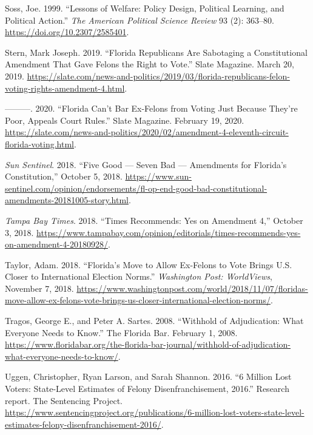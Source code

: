 \documentclass[
  12pt,
]{article}
\newlength{\cslhangindent}
\newenvironment{cslreferences}%
  {\setlength{\parindent}{0pt}%
  \everypar{\setlength{\hangindent}{\cslhangindent}}\ignorespaces}%
  {\par}
\begin{document}
\begin{cslreferences}
\leavevmode\hypertarget{ref-Soss1999}{}%
Soss, Joe. 1999. ``Lessons of Welfare: Policy Design, Political Learning, and Political Action.'' \emph{The American Political Science Review} 93 (2): 363--80. \url{https://doi.org/10.2307/2585401}.

\leavevmode\hypertarget{ref-Stern2019}{}%
Stern, Mark Joseph. 2019. ``Florida Republicans Are Sabotaging a Constitutional Amendment That Gave Felons the Right to Vote.'' Slate Magazine. March 20, 2019. \url{https://slate.com/news-and-politics/2019/03/florida-republicans-felon-voting-rights-amendment-4.html}.

\leavevmode\hypertarget{ref-Stern2020}{}%
---------. 2020. ``Florida Can't Bar Ex-Felons from Voting Just Because They're Poor, Appeals Court Rules.'' Slate Magazine. February 19, 2020. \url{https://slate.com/news-and-politics/2020/02/amendment-4-eleventh-circuit-florida-voting.html}.

\leavevmode\hypertarget{ref-SunSentinelEditorial2018}{}%
\emph{Sun Sentinel}. 2018. ``Five Good --- Seven Bad --- Amendments for Florida's Constitution,'' October 5, 2018. \url{https://www.sun-sentinel.com/opinion/endorsements/fl-op-end-good-bad-constitutional-amendments-20181005-story.html}.

\leavevmode\hypertarget{ref-tampabaytimes2018}{}%
\emph{Tampa Bay Times}. 2018. ``Times Recommends: Yes on Amendment 4,'' October 3, 2018. \url{https://www.tampabay.com/opinion/editorials/times-recommends-yes-on-amendment-4-20180928/}.

\leavevmode\hypertarget{ref-Taylor2018}{}%
Taylor, Adam. 2018. ``Florida's Move to Allow Ex-Felons to Vote Brings U.S. Closer to International Election Norms.'' \emph{Washington Post: WorldViews}, November 7, 2018. \url{https://www.washingtonpost.com/world/2018/11/07/floridas-move-allow-ex-felons-vote-brings-us-closer-international-election-norms/}.

\leavevmode\hypertarget{ref-Tragos2008}{}%
Tragos, George E., and Peter A. Sartes. 2008. ``Withhold of Adjudication: What Everyone Needs to Know.'' The Florida Bar. February 1, 2008. \url{https://www.floridabar.org/the-florida-bar-journal/withhold-of-adjudication-what-everyone-needs-to-know/}.

\leavevmode\hypertarget{ref-sentencing_2016}{}%
Uggen, Christopher, Ryan Larson, and Sarah Shannon. 2016. ``6 Million Lost Voters: State-Level Estimates of Felony Disenfranchisement, 2016.'' Research report. The Sentencing Project. \url{https://www.sentencingproject.org/publications/6-million-lost-voters-state-level-estimates-felony-disenfranchisement-2016/}.


\end{cslreferences}
\end{document}

